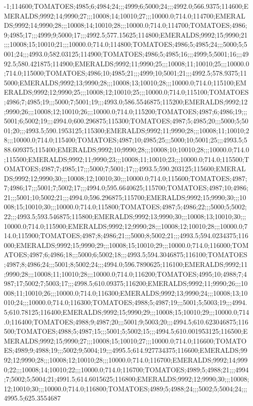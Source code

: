 -1;114600;TOMATOES;4985;6;4984;24;;;4999;6;5000;24;;;4992.0;566.9375;114600;EMERALDS;9992;14;9990;27;;;10008;14;10010;27;;;10000.0;714.0;114700;EMERALDS;9992;14;9990;28;;;10008;14;10010;28;;;10000.0;714.0;114700;TOMATOES;4986;9;4985;17;;;4999;9;5000;17;;;4992.5;577.15625;114800;EMERALDS;9992;15;9990;21;;;10008;15;10010;21;;;10000.0;714.0;114800;TOMATOES;4986;5;4985;24;;;5000;5;5001;24;;;4993.0;582.03125;114900;TOMATOES;4986;5;4985;16;;;4999;5;5001;16;;;4992.5;580.421875;114900;EMERALDS;9992;11;9990;25;;;10008;11;10010;25;;;10000.0;714.0;115000;TOMATOES;4986;10;4985;21;;;4999;10;5001;21;;;4992.5;578.9375;115000;EMERALDS;9992;13;9990;28;;;10008;13;10010;28;;;10000.0;714.0;115100;EMERALDS;9992;12;9990;25;;;10008;12;10010;25;;;10000.0;714.0;115100;TOMATOES;4986;7;4985;19;;;5000;7;5001;19;;;4993.0;586.5546875;115200;EMERALDS;9992;12;9990;26;;;10008;12;10010;26;;;10000.0;714.0;115200;TOMATOES;4987;6;4986;19;;;5001;6;5002;19;;;4994.0;600.296875;115300;TOMATOES;4987;5;4985;20;;;5000;5;5001;20;;;4993.5;590.1953125;115300;EMERALDS;9992;11;9990;28;;;10008;11;10010;28;;;10000.0;714.0;115400;TOMATOES;4987;10;4985;25;;;5000;10;5001;25;;;4993.5;588.609375;115400;EMERALDS;9992;10;9990;28;;;10008;10;10010;28;;;10000.0;714.0;115500;EMERALDS;9992;11;9990;23;;;10008;11;10010;23;;;10000.0;714.0;115500;TOMATOES;4987;7;4985;17;;;5000;7;5001;17;;;4993.5;590.203125;115600;EMERALDS;9992;12;9990;30;;;10008;12;10010;30;;;10000.0;714.0;115600;TOMATOES;4987;7;4986;17;;;5001;7;5002;17;;;4994.0;595.6640625;115700;TOMATOES;4987;10;4986;21;;;5001;10;5002;21;;;4994.0;596.296875;115700;EMERALDS;9992;15;9990;30;;;10008;15;10010;30;;;10000.0;714.0;115800;TOMATOES;4987;5;4986;22;;;5000;5;5002;22;;;4993.5;593.546875;115800;EMERALDS;9992;13;9990;30;;;10008;13;10010;30;;;10000.0;714.0;115900;EMERALDS;9992;12;9990;28;;;10008;12;10010;28;;;10000.0;714.0;115900;TOMATOES;4987;8;4986;21;;;5000;8;5002;21;;;4993.5;594.0234375;116000;EMERALDS;9992;15;9990;29;;;10008;15;10010;29;;;10000.0;714.0;116000;TOMATOES;4987;6;4986;18;;;5000;6;5002;18;;;4993.5;594.3046875;116100;TOMATOES;4987;8;4986;24;;;5001;8;5002;24;;;4994.0;596.7890625;116100;EMERALDS;9992;11;9990;28;;;10008;11;10010;28;;;10000.0;714.0;116200;TOMATOES;4995;10;4988;7;4987;17;5002;7;5003;17;;;4998.5;610.09375;116200;EMERALDS;9992;11;9990;26;;;10008;11;10010;26;;;10000.0;714.0;116300;EMERALDS;9992;13;9990;24;;;10008;13;10010;24;;;10000.0;714.0;116300;TOMATOES;4988;5;4987;19;;;5001;5;5003;19;;;4994.5;610.78125;116400;EMERALDS;9992;15;9990;29;;;10008;15;10010;29;;;10000.0;714.0;116400;TOMATOES;4988;9;4987;20;;;5001;9;5003;20;;;4994.5;610.623046875;116500;TOMATOES;4988;5;4987;15;;;5001;5;5002;15;;;4994.5;610.001953125;116500;EMERALDS;9992;15;9990;27;;;10008;15;10010;27;;;10000.0;714.0;116600;TOMATOES;4989;9;4988;19;;;5002;9;5004;19;;;4995.5;614.927734375;116600;EMERALDS;9992;12;9990;28;;;10008;12;10010;28;;;10000.0;714.0;116700;EMERALDS;9992;14;9990;22;;;10008;14;10010;22;;;10000.0;714.0;116700;TOMATOES;4989;5;4988;21;;;4994;7;5002;5;5004;21;4991.5;614.6015625;116800;EMERALDS;9992;12;9990;30;;;10008;12;10010;30;;;10000.0;714.0;116800;TOMATOES;4989;5;4988;24;;;5002;5;5004;24;;;4995.5;625.3554687